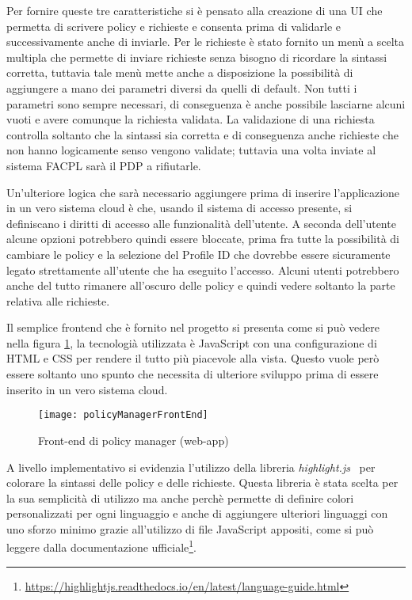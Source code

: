 Per fornire queste tre caratteristiche si è pensato alla creazione di una UI che permetta di scrivere policy e richieste e consenta prima di validarle e successivamente anche di inviarle. Per le richieste è stato fornito un menù a scelta multipla che permette di inviare richieste senza bisogno di ricordare la sintassi corretta, tuttavia tale menù mette anche a disposizione la possibilità di aggiungere a mano dei parametri diversi da quelli di default. Non tutti i parametri sono sempre necessari, di conseguenza è anche possibile lasciarne alcuni vuoti e avere comunque la richiesta validata. La validazione di una richiesta controlla soltanto che la sintassi sia corretta e di conseguenza anche richieste che non hanno logicamente senso vengono validate; tuttavia una volta inviate al sistema FACPL sarà il PDP a rifiutarle.\par
Un'ulteriore logica che sarà necessario aggiungere prima di inserire l'applicazione in un vero sistema cloud è che, usando il sistema di accesso presente, si definiscano i diritti di accesso alle funzionalità dell'utente. A seconda dell'utente alcune opzioni potrebbero quindi essere bloccate, prima fra tutte la possibilità di cambiare le policy e la selezione del Profile ID che dovrebbe essere sicuramente legato strettamente all'utente che ha eseguito l'accesso. Alcuni utenti potrebbero anche del tutto rimanere all'oscuro delle policy e quindi vedere soltanto la parte relativa alle richieste.\par
Il semplice frontend che è fornito nel progetto si presenta come si può vedere nella figura \ref{fig:policyManagerFrontEnd}, la tecnologià utilizzata è JavaScript con una configurazione di HTML e CSS per rendere il tutto più piacevole alla vista. Questo vuole però essere soltanto uno spunto che necessita di ulteriore sviluppo prima di essere inserito in un vero sistema cloud.
\begin{figure}[H]
    \begin{center}
    \texttt{[image: policyManagerFrontEnd]}
    \caption{Front-end di policy manager (web-app)}
    \label{fig:policyManagerFrontEnd}
    \end{center}
\end{figure}
A livello implementativo si evidenzia l'utilizzo della libreria \emph{highlight.js}~\cite{highlightjs} per colorare la sintassi delle policy e delle richieste. Questa libreria è stata scelta per la sua semplicità di utilizzo ma anche perchè permette di definire colori personalizzati per ogni linguaggio e anche di aggiungere ulteriori linguaggi con uno sforzo minimo grazie all'utilizzo di file JavaScript appositi, come si può leggere dalla documentazione ufficiale\footnote{\url{https://highlightjs.readthedocs.io/en/latest/language-guide.html}}.\par

